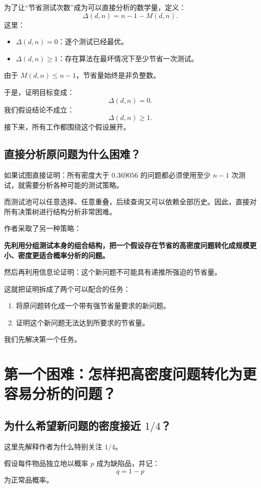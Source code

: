 \documentclass[UTF8,11pt]{ctexart}
\begin{document}
为了让“节省测试次数”成为可以直接分析的数学量，定义：
\begin{equation}\boxed{\Delta(d,n)=n-1-M(d,n).}\tag{1}\end{equation}
这里：
\begin{itemize}
\item $\Delta(d,n)=0$：逐个测试已经最优。
\item $\Delta(d,n)\ge1$：存在算法在最坏情况下至少节省一次测试。
\end{itemize}
由于 $M(d,n)\le n-1$，节省量始终是非负整数。

于是，证明目标变成：
\[\boxed{\Delta(d,n)=0.}\]
我们假设结论不成立：
\begin{equation}\boxed{\Delta(d,n)\ge1.}\tag{2}\end{equation}
接下来，所有工作都围绕这个假设展开。

\subsection{直接分析原问题为什么困难？}
如果试图直接证明：所有密度大于 $0.369056$ 的问题都必须使用至少 $n-1$ 次测试，就需要分析各种可能的测试策略。

而测试池可以任意选择、任意重叠，后续查询又可以依赖全部历史。因此，直接对所有决策树进行结构分析非常困难。

作者采取了另一种策略：

\textbf{先利用分组测试本身的组合结构，把一个假设存在节省的高密度问题转化成规模更小、密度更适合概率分析的问题。}

然后再利用信息论证明：这个新问题不可能具有递推所强迫的节省量。

这就把证明拆成了两个可以配合的任务：
\begin{enumerate}
\item 将原问题转化成一个带有强节省量要求的新问题。
\item 证明这个新问题无法达到所要求的节省量。
\end{enumerate}
我们先解决第一个任务。

\section{第一个困难：怎样把高密度问题转化为更容易分析的问题？}
\subsection{为什么希望新问题的密度接近 $1/4$？}
这里先解释作者为什么特别关注 $1/4$。

假设每件物品独立地以概率 $p$ 成为缺陷品，并记：
\[q=1-p\]
为正常品概率。
\end{document}
